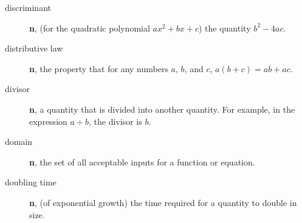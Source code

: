 \documentclass[10pt,]{book}
\newcommand{\terminology}[1]{\textbf{#1}}
\theoremstyle{plain}
\theoremstyle{definition}
\theoremstyle{definition}
\theoremstyle{definition}
\numberwithin{equation}{part}
\begin{document}
\begin{description}
\item[{discriminant}]\hypertarget{li-556}{}\terminology{n}, (for the quadratic polynomial \(ax^2 + bx + c\)) the quantity \(b^2 − 4ac\).%
\item[{distributive law}]\hypertarget{li-557}{}\terminology{n}, the property that for any numbers \(a\), \(b\), and \(c\), \(a(b + c) = ab + ac\).%
\item[{divisor}]\hypertarget{li-558}{}\terminology{n}, a quantity that is divided into another quantity. For example, in the expression \(a\div  b\), the divisor is \(b\).%
\item[{domain}]\hypertarget{li-559}{}\terminology{n}, the set of all acceptable inputs for a function or equation.%
\item[{doubling time}]\hypertarget{li-560}{}\terminology{n}, (of exponential growth) the time required for a quantity to double in size.%
\end{description}
%
\typeout{************************************************}
\typeout{************************************************}
\end{document}
